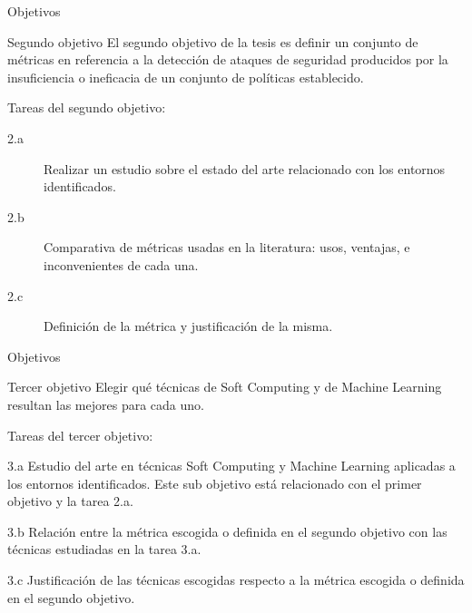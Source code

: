 \documentclass{beamer}
\begin{document}
\begin{frame}{Objetivos}

\begin{block}{Segundo objetivo}
El segundo objetivo de la tesis es definir un conjunto de métricas en referencia a la detección de ataques de seguridad producidos por la insuficiencia o ineficacia de un conjunto de políticas establecido.
\end{block}

Tareas del segundo objetivo:

\begin{description}
  \item[2.a] Realizar un estudio sobre el estado del arte
    relacionado con los entornos identificados. 
  \item[2.b] Comparativa de métricas usadas en la literatura: usos, ventajas, e inconvenientes de cada una.
  \item[2.c] Definición de la métrica y justificación de la misma.
\end{description}

\end{frame}

\begin{frame}{Objetivos}

\begin{block}{Tercer objetivo}
Elegir qué técnicas de Soft Computing y de Machine Learning resultan las mejores para cada uno.
\end{block}

Tareas del tercer objetivo:

\begin{description}
  \begin{small}
  \item[3.a] Estudio del arte en técnicas Soft Computing y Machine Learning aplicadas a los entornos identificados. Este sub objetivo está relacionado con el primer objetivo y la tarea 2.a.
  \item[3.b] Relación entre la métrica escogida o definida en el segundo objetivo con las técnicas estudiadas en la tarea 3.a.
  \item[3.c] Justificación de las técnicas escogidas respecto a la métrica escogida o definida en el segundo objetivo.
  \end{small}
\end{description}

\end{frame}
\end{document}
